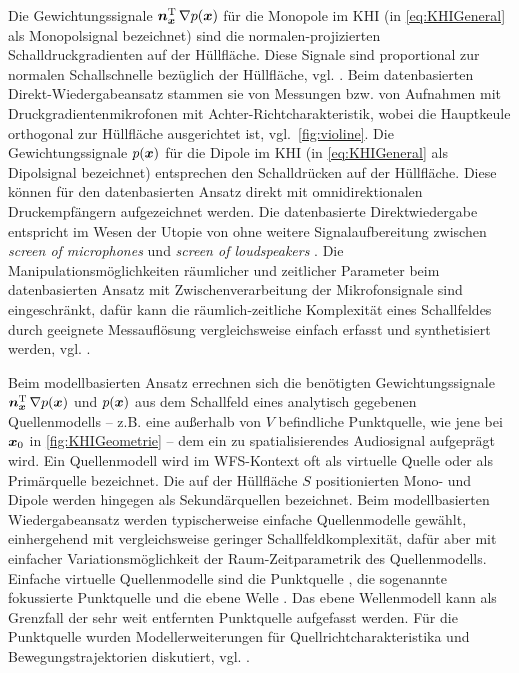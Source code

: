 Die Gewichtungssignale $\bm{n}^\mathrm{T}_{\bm{x}} \, \nabla p(\bm{x})$ für die Monopole im KHI
(in \Glg\eqref{eq:KHIGeneral} als Monopolsignal bezeichnet)
sind die normalen-projizierten Schalldruckgradienten auf der Hüllfläche.
%
Diese Signale sind proportional zur normalen Schallschnelle bezüglich der Hüllfläche,
vgl. \cite{Berkhout1993_JASA, Vries1996_JAES}.
%
Beim datenbasierten Direkt-Wiedergabeansatz stammen sie von
Messungen bzw. von Aufnahmen mit Druckgradientenmikrofonen
mit Achter-Richtcharakteristik, wobei die Hauptkeule
orthogonal zur Hüllfläche ausgerichtet ist, vgl.~\Abb\ref{fig:violine}.
%
Die Gewichtungssignale $p(\bm{x})$ für die Dipole im KHI (in
\Glg\eqref{eq:KHIGeneral} als Dipolsignal bezeichnet)
entsprechen den Schalldrücken auf der Hüllfläche.
%
Diese können für den datenbasierten Ansatz direkt mit omnidirektionalen
Druckempfängern aufgezeichnet werden.
%
Die datenbasierte Direktwiedergabe entspricht im Wesen der Utopie
von \cite{Fletcher1934,Steinberg1934} ohne weitere
Signalaufbereitung zwischen \textit{screen of microphones} und
\textit{screen of loudspeakers} \cite[S.\,572]{Snow1953}.
%
Die Manipulationsmöglichkeiten räumlicher und zeitlicher Parameter beim
datenbasierten Ansatz mit Zwischenverarbeitung der Mikrofonsignale sind
eingeschränkt, dafür kann die räumlich-zeitliche Komplexität eines
Schallfeldes durch geeignete Messauflösung vergleichsweise
einfach erfasst und synthetisiert
werden, vgl. \cite{Sonke2000_diss,Hulsebos2004_diss,Vries2007_JASP}.



Beim modellbasierten Ansatz errechnen sich die benötigten Gewichtungssignale
$\bm{n}^\mathrm{T}_{\bm{x}} \, \nabla p(\bm{x})$ und $p(\bm{x})$ aus dem Schallfeld eines analytisch
gegebenen Quellenmodells -- z.B. eine außerhalb von $V$ befindliche Punktquelle,
wie jene bei $\bm{x}_\mathrm{0}$ in \Abb\ref{fig:KHIGeometrie} -- dem ein zu spatialisierendes
Audiosignal aufgeprägt wird.
%
Ein Quellenmodell wird im WFS-Kontext oft als virtuelle Quelle oder als
Primärquelle bezeichnet.
%
Die auf der Hüllfläche $S$ positionierten Mono- und Dipole werden hingegen
als Sekundärquellen bezeichnet.
%
Beim modellbasierten Wiedergabeansatz
werden typischerweise einfache Quellenmodelle gewählt, einhergehend mit vergleichsweise
geringer Schallfeldkomplexität, dafür aber mit einfacher Variationsmöglichkeit
der Raum-Zeitparametrik des Quellenmodells.
%
Einfache virtuelle Quellenmodelle sind die
Punktquelle \cite{Berkhout1993_JASA,Start1997_diss},
die sogenannte fokussierte Punktquelle \cite{Verheijen1997_diss,Spors2007b,Melchior2008,Wierstorf2014_diss}
und die ebene Welle \cite{Spors2008a, Voelk2012, Firtha2019_diss}.
%
Das ebene Wellenmodell kann als Grenzfall der sehr weit
entfernten Punktquelle aufgefasst werden.
%
Für die Punktquelle wurden Modellerweiterungen für Quellrichtcharakteristika und
Bewegungstrajektorien diskutiert, vgl. \cite{Corteel2007_JASP,Baalman2008_diss,Franck2012,Romoli2015_ApplAc,Schultz2017,Franck2007,Ahrens2011,Firtha2019_diss}.



